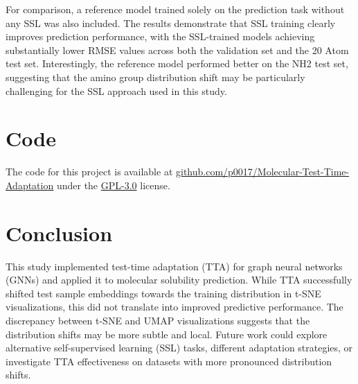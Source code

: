 \documentclass[11pt,a4paper]{article}
\begin{document}
For comparison, a reference model trained solely on the prediction task without any SSL was also included. The results demonstrate that SSL training clearly improves prediction performance, with the SSL-trained models achieving substantially lower RMSE values across both the validation set and the 20 Atom test set. Interestingly, the reference model performed better on the NH2 test set, suggesting that the amino group distribution shift may be particularly challenging for the SSL approach used in this study.

\section{Code}
The code for this project is available at \href{https://github.com/p0017/Molecular-Test-Time-Adaptation}{github.com/p0017/Molecular-Test-Time-Adaptation} under the \href{(https://www.gnu.org/licenses/gpl-3.0)}{GPL-3.0} license.

\section{Conclusion}

This study implemented test-time adaptation (TTA) for graph neural networks (GNNs) and applied it to molecular solubility prediction. While TTA successfully shifted test sample embeddings towards the training distribution in t-SNE visualizations, this did not translate into improved predictive performance. The discrepancy between t-SNE and UMAP visualizations suggests that the distribution shifts may be more subtle and local. Future work could explore alternative self-supervised learning (SSL) tasks, different adaptation strategies, or investigate TTA effectiveness on datasets with more pronounced distribution shifts.



\end{document}
